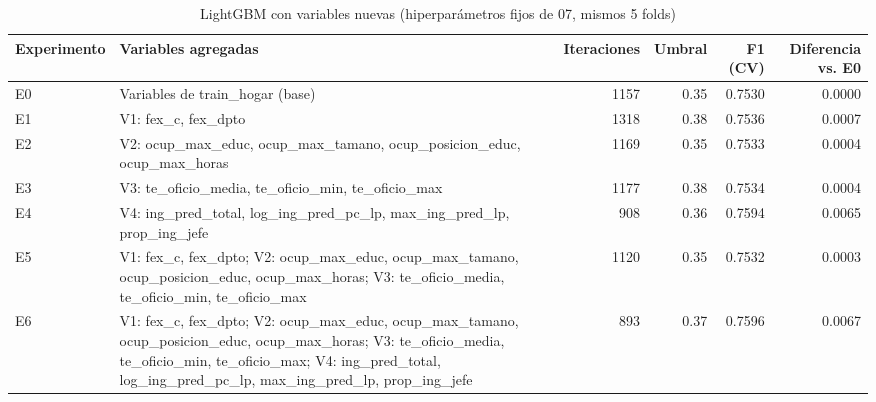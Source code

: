 \begin{table}

\caption{\label{tab:boosting_variables}LightGBM con variables nuevas (hiperparámetros fijos de 07, mismos 5 folds)}
\centering
\begin{tabular}[t]{lp{8cm}rrrr}
\toprule
Experimento & Variables agregadas & Iteraciones & Umbral & F1 (CV) & Diferencia vs. E0\\
\midrule
E0 & Variables de train\_hogar (base) & 1157 & 0.35 & 0.7530 & 0.0000\\
E1 & V1: fex\_c, fex\_dpto & 1318 & 0.38 & 0.7536 & 0.0007\\
E2 & V2: ocup\_max\_educ, ocup\_max\_tamano, ocup\_posicion\_educ, ocup\_max\_horas & 1169 & 0.35 & 0.7533 & 0.0004\\
E3 & V3: te\_oficio\_media, te\_oficio\_min, te\_oficio\_max & 1177 & 0.38 & 0.7534 & 0.0004\\
E4 & V4: ing\_pred\_total, log\_ing\_pred\_pc\_lp, max\_ing\_pred\_lp, prop\_ing\_jefe & 908 & 0.36 & 0.7594 & 0.0065\\
\addlinespace
E5 & V1: fex\_c, fex\_dpto; V2: ocup\_max\_educ, ocup\_max\_tamano, ocup\_posicion\_educ, ocup\_max\_horas; V3: te\_oficio\_media, te\_oficio\_min, te\_oficio\_max & 1120 & 0.35 & 0.7532 & 0.0003\\
E6 & V1: fex\_c, fex\_dpto; V2: ocup\_max\_educ, ocup\_max\_tamano, ocup\_posicion\_educ, ocup\_max\_horas; V3: te\_oficio\_media, te\_oficio\_min, te\_oficio\_max; V4: ing\_pred\_total, log\_ing\_pred\_pc\_lp, max\_ing\_pred\_lp, prop\_ing\_jefe & 893 & 0.37 & 0.7596 & 0.0067\\
\bottomrule
\end{tabular}
\end{table}
